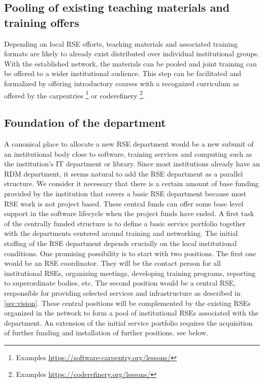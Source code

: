 \documentclass{article}
\begin{document}
\subsection{Pooling of existing teaching materials and training offers}

Depending on local RSE efforts, teaching materials and associated training formats are likely to already exist distributed over individual institutional groups.
With the established network, the materials can be pooled and joint training can be offered to a wider institutional audience.
This step can be facilitated and formalized by offering introductory courses with a recognized curriculum as offered by the carpentries
\footnote{Examples \url{https://software-carpentry.org/lessons/}}
or coderefinery 
\footnote{Examples \url{https://coderefinery.org/lessons/}}.

\subsection{Foundation of the department}

A canonical place to allocate a new RSE department would be a new subunit of an institutional body close to software, training services and computing such as the institution's IT department or library.
Since most institutions already have an RDM department, it seems natural to add the RSE department as a parallel structure.
We consider it necessary that there is a certain amount of base funding provided by the institution that covers a basic RSE department because most RSE work is not project based.
These central funds can offer some base level support in the software lifecycle when the project funds have ended.
A first task of the centrally funded structure is to define a basic service portfolio together with the departments centered around training and networking.
The initial staffing of the RSE department depends crucially on the local institutional conditions. 
One promising possibility is to start with two positions. The first one would be an RSE coordinator.
They will be the contact person for all institutional RSEs, organizing meetings, developing training programs, reporting to superordinate bodies, etc.
The second position would be a central RSE, responsible for providing selected services and infrastructure as described in \autoref{sec:vision}.
These central positions will be complemented by the existing RSEs organized in the network to form a pool of institutional RSEs associated with the department.
An extension of the initial service portfolio requires the acquisition of further funding and installation of further positions, see below.
\end{document}
